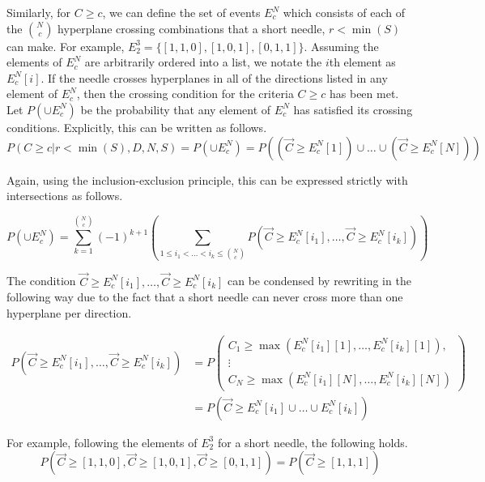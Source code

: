 \documentclass{article}
\begin{document}
Similarly, for $C\ge c$, we can define the set of events $E_c^N$ which consists of each of the
$N \choose c$ hyperplane crossing combinations that a short needle, $r<\min(S)$ can make. For example, 
$E_2^3=\{[1,1,0], [1,0,1], [0,1,1]\}$. Assuming the elements of $E_c^N$ are arbitrarily ordered into a list,
we notate the $i$th element as $E_c^N[i]$. If the needle crosses hyperplanes in all of the directions listed
in any element of $E_c^N$, then the crossing condition for the criteria $C \ge c$ has been met. Let
$P(\cup E_c^N)$ be the probability that any element of $E_c^N$ has satisfied its crossing conditions.
Explicitly, this can be written as follows.
\begin{equation}
	P(C\ge c|r<\min(S), D, N, S) = P(\cup E_c^N) = P((\vec{C} \ge E_c^N[1]) \cup \hdots \cup (\vec{C} \ge E_c^N[N]))
\end{equation}

Again, using the inclusion-exclusion principle, this can be expressed strictly with intersections as follows.

\begin{equation}
	P(\cup E_c^N) = \sum_{k=1}^{N\choose c} (-1)^{k+1}\left(\sum_{1\le i_1 < \hdots < i_k \le {N\choose c}}P(\vec{C}\ge E_c^N[i_1] , \hdots , \vec{C}\ge E_c^N[i_k]) \right)
\end{equation}

The condition $\vec{C}\ge E_c^N[i_1], \hdots , \vec{C}\ge E_c^N[i_k]$ can be condensed by rewriting in the
following way due to the fact that a short needle can never cross more than one hyperplane per direction.

\begin{align}
	P(\vec{C}\ge E_c^N[i_1], \hdots , \vec{C}\ge E_c^N[i_k]) &= P\begin{pmatrix}
		C_1 \ge \max(E_c^N[i_1][1], \hdots, E_c^N[i_k][1]), \\
		\vdots \\
		C_N \ge \max(E_c^N[i_1][N], \hdots, E_c^N[i_k][N])
	\end{pmatrix} \\
	&= P(\vec{C}\ge E_c^N[i_1]\cup \hdots \cup E_c^N[i_k])
\end{align}

For example, following the elements of $E_2^3$ for a short needle, the following holds.
\begin{equation}
	P(\vec{C}\ge[1,1,0], \vec{C}\ge[1,0,1], \vec{C}\ge [0,1,1]) = P(\vec{C} \ge [1,1,1])
\end{equation}
\end{document}
